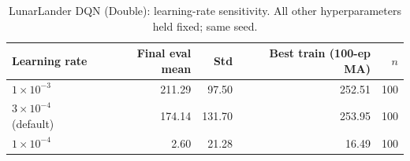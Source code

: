 \begin{table}[h]\centering\small
\caption{LunarLander DQN (Double): learning-rate sensitivity. All other hyperparameters held fixed; same seed.}
\label{tab:lr_ablation}
\begin{tabular}{lrrrr}
\toprule
Learning rate & Final eval mean & Std & Best train (100-ep MA) & $n$ \\
\midrule
$1\times 10^{-3}$ & 211.29 & 97.50 & 252.51 & 100 \\
$3\times 10^{-4}$ (default) & 174.14 & 131.70 & 253.95 & 100 \\
$1\times 10^{-4}$ & 2.60 & 21.28 & 16.49 & 100 \\
\bottomrule
\end{tabular}
\end{table}
